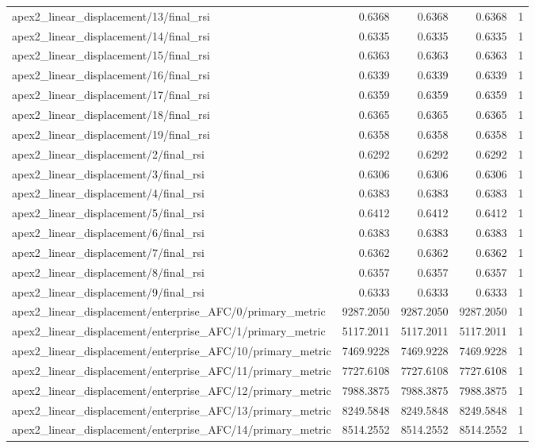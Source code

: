\begin{table}[h]
\begin{tabular}{lrrrr}
apex2_linear_displacement/13/final_rsi & 0.6368 & 0.6368 & 0.6368 & 1 \\
apex2_linear_displacement/14/final_rsi & 0.6335 & 0.6335 & 0.6335 & 1 \\
apex2_linear_displacement/15/final_rsi & 0.6363 & 0.6363 & 0.6363 & 1 \\
apex2_linear_displacement/16/final_rsi & 0.6339 & 0.6339 & 0.6339 & 1 \\
apex2_linear_displacement/17/final_rsi & 0.6359 & 0.6359 & 0.6359 & 1 \\
apex2_linear_displacement/18/final_rsi & 0.6365 & 0.6365 & 0.6365 & 1 \\
apex2_linear_displacement/19/final_rsi & 0.6358 & 0.6358 & 0.6358 & 1 \\
apex2_linear_displacement/2/final_rsi & 0.6292 & 0.6292 & 0.6292 & 1 \\
apex2_linear_displacement/3/final_rsi & 0.6306 & 0.6306 & 0.6306 & 1 \\
apex2_linear_displacement/4/final_rsi & 0.6383 & 0.6383 & 0.6383 & 1 \\
apex2_linear_displacement/5/final_rsi & 0.6412 & 0.6412 & 0.6412 & 1 \\
apex2_linear_displacement/6/final_rsi & 0.6383 & 0.6383 & 0.6383 & 1 \\
apex2_linear_displacement/7/final_rsi & 0.6362 & 0.6362 & 0.6362 & 1 \\
apex2_linear_displacement/8/final_rsi & 0.6357 & 0.6357 & 0.6357 & 1 \\
apex2_linear_displacement/9/final_rsi & 0.6333 & 0.6333 & 0.6333 & 1 \\
apex2_linear_displacement/enterprise_AFC/0/primary_metric & 9287.2050 & 9287.2050 & 9287.2050 & 1 \\
apex2_linear_displacement/enterprise_AFC/1/primary_metric & 5117.2011 & 5117.2011 & 5117.2011 & 1 \\
apex2_linear_displacement/enterprise_AFC/10/primary_metric & 7469.9228 & 7469.9228 & 7469.9228 & 1 \\
apex2_linear_displacement/enterprise_AFC/11/primary_metric & 7727.6108 & 7727.6108 & 7727.6108 & 1 \\
apex2_linear_displacement/enterprise_AFC/12/primary_metric & 7988.3875 & 7988.3875 & 7988.3875 & 1 \\
apex2_linear_displacement/enterprise_AFC/13/primary_metric & 8249.5848 & 8249.5848 & 8249.5848 & 1 \\
apex2_linear_displacement/enterprise_AFC/14/primary_metric & 8514.2552 & 8514.2552 & 8514.2552 & 1 \\

\end{tabular}
\end{table}
